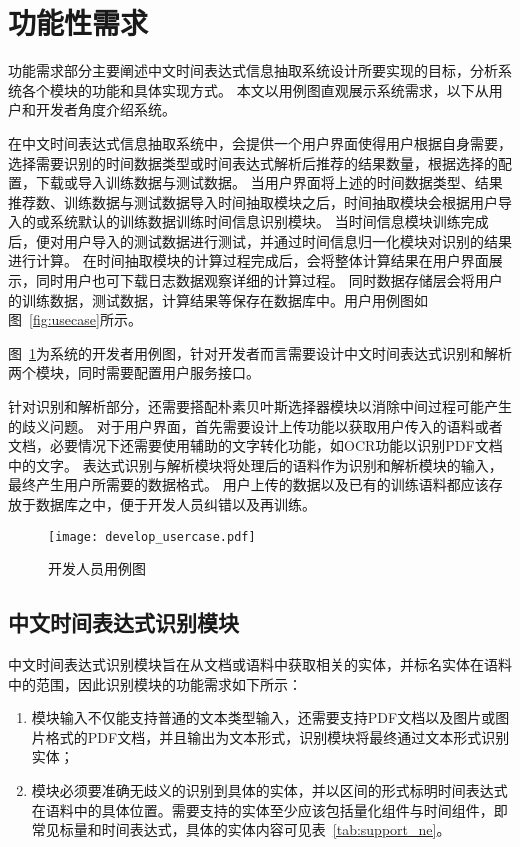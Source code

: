 \section{功能性需求}

功能需求部分主要阐述中文时间表达式信息抽取系统设计所要实现的目标，分析系统各个模块的功能和具体实现方式。
本文以用例图直观展示系统需求，以下从用户和开发者角度介绍系统。

在中文时间表达式信息抽取系统中，会提供一个用户界面使得用户根据自身需要，选择需要识别的时间数据类型或时间表达式解析后推荐的结果数量，根据选择的配置，下载或导入训练数据与测试数据。
当用户界面将上述的时间数据类型、结果推荐数、训练数据与测试数据导入时间抽取模块之后，时间抽取模块会根据用户导入的或系统默认的训练数据训练时间信息识别模块。
当时间信息模块训练完成后，便对用户导入的测试数据进行测试，并通过时间信息归一化模块对识别的结果进行计算。
在时间抽取模块的计算过程完成后，会将整体计算结果在用户界面展示，同时用户也可下载日志数据观察详细的计算过程。
同时数据存储层会将用户的训练数据，测试数据，计算结果等保存在数据库中。用户用例图如图~\ref{fig:usecase}所示。

图~\ref{fig:develope_usecase}为系统的开发者用例图，针对开发者而言需要设计中文时间表达式识别和解析两个模块，同时需要配置用户服务接口。

针对识别和解析部分，还需要搭配朴素贝叶斯选择器模块以消除中间过程可能产生的歧义问题。
对于用户界面，首先需要设计上传功能以获取用户传入的语料或者文档，必要情况下还需要使用辅助的文字转化功能，如OCR功能以识别PDF文档中的文字。
表达式识别与解析模块将处理后的语料作为识别和解析模块的输入，最终产生用户所需要的数据格式。
用户上传的数据以及已有的训练语料都应该存放于数据库之中，便于开发人员纠错以及再训练。

\begin{figure}[t]
    \centering
    \texttt{[image: develop\_usercase.pdf]}
    \caption{开发人员用例图}
    \label{fig:develope_usecase}
\end{figure}

\subsection{中文时间表达式识别模块}

中文时间表达式识别模块旨在从文档或语料中获取相关的实体，并标名实体在语料中的范围，因此识别模块的功能需求如下所示：
\begin{enumerate}
    \item[(1)] 模块输入不仅能支持普通的文本类型输入，还需要支持PDF文档以及图片或图片格式的PDF文档，并且输出为文本形式，识别模块将最终通过文本形式识别实体；
    \item[(2)] 模块必须要准确无歧义的识别到具体的实体，并以区间的形式标明时间表达式在语料中的具体位置。需要支持的实体至少应该包括量化组件与时间组件，即常见标量和时间表达式，具体的实体内容可见表~\ref{tab:support_ne}。
\end{enumerate}

